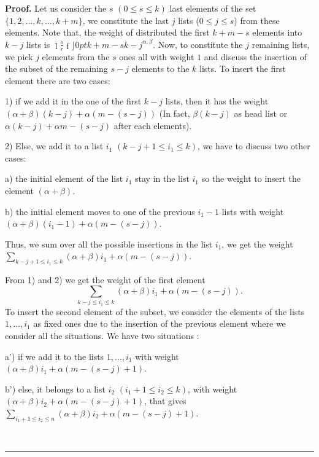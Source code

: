 \documentclass{article}
\newcommand {\lah}[2]{\genfrac\lfloor \rfloor{0pt}{}{#1}{#2}}
\newenvironment{proof}[1][Proof]{\noindent\textbf{#1.} }{\ \rule{0.5em}{0.5em}}
\begin{document}
\begin{proof}
Let us consider the $s$ $(0\leq s \leq k)$ last elements of the set $\{1,2,\ldots ,k,\ldots ,k+m\}$, we
constitute the last $j$ lists ($0\leq j\leq s$) from these elements. Note that,
the weight of distributed the first $k+m-s$ elements into $k-j$ lists is $%
\lah{k+m-s}{k-j}^{\alpha ,\beta }$. Now, to constitute
the $j$ remaining lists, we pick $j$ elements from the $s$ ones all with weight $%
1 $ and discuss the insertion of the subset of the remaining $s-j$ elements to the $k$ lists. To
insert the first element there are two cases:

1) if we add it in the one of the first $k-j$ lists, then it has the weight $\left( \alpha +\beta \right) \left( k-j\right) +\alpha
\left( m-\left( s-j\right) \right) $ (In fact, $\beta \left( k-j\right) $ as head
list or $\alpha \left( k-j\right) +\alpha m-\left( s-j\right) $ after each elements).

2) Else, we add it to a list $i_{1}$ $(k-j+1\leq i_{1}\leq k)$, we have to
discuss two other cases:

a) the initial element of the list $i_{1}$ stay in the list $i_{1}$ so the
weight to insert the element  $\left( \alpha +\beta \right)$.

b) the initial element moves to one of the previous $i_{1}-1$ lists with
weight $\left( \alpha +\beta \right) (i_{1}-1)+\alpha \left( m-\left(
s-j\right) \right) $.


Thus, we sum over all
the possible insertions in the list $i_{1}$, we get the weight
 $\sum_{k-j+1\leq i_{1}\leq
k}\left( \alpha +\beta \right) i_{1}+\alpha \left( m-\left( s-j\right)
\right) $.


From 1) and 2) we get the weight of the first element
 \begin{equation*}
 \sum_{k-j\leq i_{1}\leq k}\left( \alpha +\beta \right) i_{1}+\alpha
\left( m-\left( s-j\right) \right) .
 \end{equation*}
To insert the second element of the subset, we consider the elements of the lists $%
1,\ldots ,i_{1}$ as fixed ones due to the insertion of the previous element
where we consider all the situations. We have two situations :


a') if we add it to the lists $1,\ldots ,i_{1}$ with weight $\left(
\alpha +\beta \right) i_{1}+\alpha \left( m-\left( s-j\right) +1\right) $.

b') else, it belongs to a list $i_{2}$ $\left( i_{1}+1\leq i_{2}\leq
k\right) $, with weight $\left( \alpha +\beta \right) i_{2}+\alpha \left(
m-\left( s-j\right) +1\right) $, that gives $\sum_{i_{1}+1\leq i_{2}\leq
n}\left( \alpha +\beta \right) i_{2}+\alpha \left( m-\left( s-j\right)
+1\right) $.


\end{proof}
\end{document}
